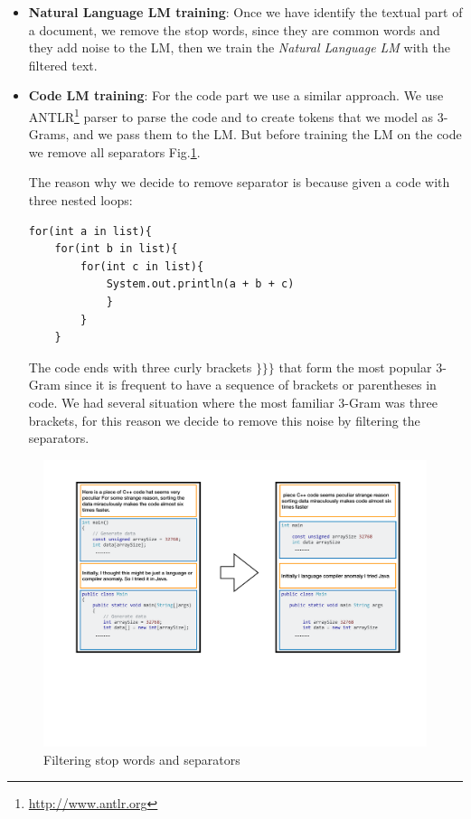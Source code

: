 \documentclass[12pt,mscthesis]{usiinfthesis}
\begin{document}
	\begin{itemize}
		\item \textbf{Natural Language LM training}: Once we have identify the textual part of a document, we remove the stop words, since they are common words and they add noise to the LM, then we train the \emph{Natural Language LM} with the filtered text.
		\item \textbf{Code LM training}: For the code part we use a similar approach. We use ANTLR\footnote{\url{http://www.antlr.org}} parser to parse the code and to create tokens that we model as 3-Grams, and we pass them to the LM. But before training the LM on the code we remove all separators Fig.\ref{FilterLM}.


		The reason why we decide to remove separator is because given a code with three nested loops:	

		\begin{lstlisting}
for(int a in list){
	for(int b in list){
		for(int c in list){
			System.out.println(a + b + c)
			}
		}
	}

		\end{lstlisting}

		The code ends with three curly brackets $\textbf{\}\}\}}$ that form the most popular 3-Gram since it is frequent to have a sequence of brackets or parentheses in code. We had several situation where the most familiar 3-Gram was three brackets, for this reason we decide to remove this noise by filtering the separators.

	\end{itemize}
	

	\begin{figure}[htbp]
	\centering
	\includegraphics[width=\textwidth]{FilterLM}
	\caption{Filtering stop words and separators}
	\label{FilterLM}
	\end{figure}
\end{document}
